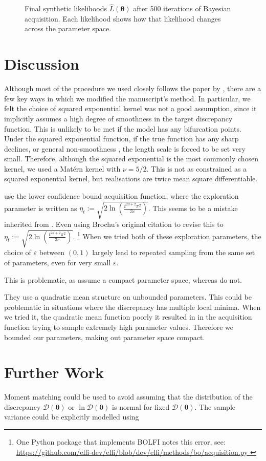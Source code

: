\begin{figure}[htbp]
\begin{subfigure}[b]{0.5\textwidth}
    \end{subfigure}%
    \caption{
        Final synthetic likelihoods $\hat{L}(\bm{\theta})$ after 500 iterations 
        of Bayesian acquisition. Each likelihood shows how that likelihood 
        changes across the parameter space.
    }
    \label{fig:final_synth_lik}
\end{figure}

\section{Discussion}

Although most of the procedure we used closely follows the paper by
\cite{gutmann_bayesian_2016}, there are a few key ways in which we modified the
manuscript's method. In particular, we felt the choice of squared exponential
kernel was not a good assumption, since it implicitly assumes a high degree of
smoothness in the target discrepancy function. This is unlikely to be met if
the model has any bifurcation points. Under the squared exponential function,
if the true function has any sharp declines, or general non-smoothness
, the length scale is forced to be set very small. Therefore,
although the squared exponential is the most commonly chosen kernel,
we used a Mat\'ern kernel with $\nu = 5/2$. This is not as constrained as a
squared exponential kernel, but realisations are twice mean square
differentiable.

\cite{gutmann_bayesian_2016} use the lower confidence bound acquisition 
function, where the
exploration parameter is written as
$\eta_t:= \sqrt{2\ln(\frac{t^{2d + 2}\pi^2}{3\varepsilon})}.$ This seems to be
a mistake inherited from \cite{brochu_tutorial_2010}. Even using Brochu's 
original 
citation
\parencite{srinivas_gaussian_2010} to revise this to
$\eta_t:= \sqrt{2\ln(\frac{t^{2d + 2}\pi^2}{3\varepsilon})}.$
\footnote{One Python package that implements BOLFI notes this error, see:
    \url{
        https://github.com/elfi-dev/elfi/blob/dev/elfi/methods/bo/acquisition.py
    }
} When we tried both of these exploration parameters, the choice of 
$\varepsilon$ between $(0, 1)$ largely lead to repeated sampling from the same
set of parameters, even for very small $\varepsilon.$

This is problematic, as \cite{srinivas_gaussian_2010} assume a compact 
parameter space, whereas \cite{gutmann_bayesian_2016} do not.

They use a quadratic mean structure on unbounded parameters.
This could be problematic in situations 
where the discrepancy has multiple local minima. When we tried it,
the quadratic mean function poorly it resulted in
in the acquisition function trying to sample extremely high parameter values.
Therefore we bounded our parameters, making out parameter space compact. 

\section{Further Work}

Moment matching could be used to avoid assuming that the distribution of 
the discrepancy $\mathcal{D}(\bm{\theta})$ or $\ln\mathcal{D}(\bm{\theta})$ 
is normal for fixed $\mathcal{D}(\bm{\theta}).$ The sample variance could
be explicitly modelled using 